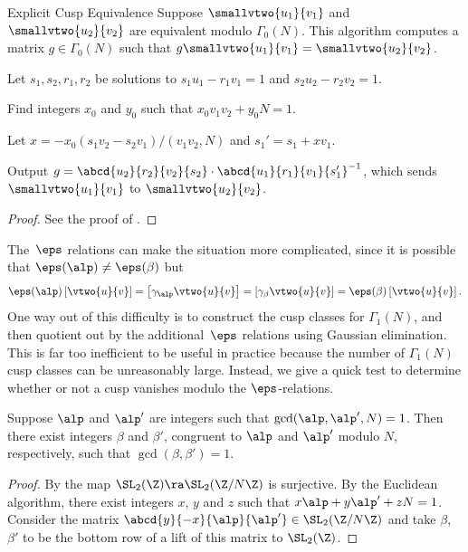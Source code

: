 \begin{algorithm}{Explicit Cusp Equivalence}\label{alg:cusp1}%
Suppose $\smallvtwo{u_1}{v_1}$ and 
$\smallvtwo{u_2}{v_2}$ 
are equivalent modulo $\Gamma_0(N)$. 
This algorithm computes a matrix $g\in\Gamma_0(N)$ such
that $g\smallvtwo{u_1}{v_1}=\smallvtwo{u_2}{v_2}$.
\begin{steps}
\item Let $s_1, s_2, r_1, r_2$ be solutions to
$s_1 u_1 -r_1 v_1 =1$ and
$s_2 u_2 -r_2 v_2 =1$.
\item Find integers $x_0$ and $y_0$ such
that $x_0v_1v_2+y_0N=1$.
\item Let $x=-x_0(s_1v_2-s_2v_1)/(v_1v_2,N)$
and $s_1' = s_1 + xv_1$.
\item Output $g=\abcd{u_2}{r_2}{v_2}{s_2}
       \cdot \abcd{u_1}{r_1}{v_1}{s_1'}^{-1}$,
which sends $\smallvtwo{u_1}{v_1}$ to $\smallvtwo{u_2}{v_2}$.
\end{steps}
\end{algorithm}
\begin{proof}
  See the proof of
 \cite[Prop.~\ref{prop:cusp1}]{cremona:algs}.
\end{proof}

The~$\eps$ relations can make the situation more
complicated, since it is possible that $\eps(\alp)\neq
\eps(\beta)$ but
$$\eps(\alp)\left[\vtwo{u}{v}\right] =\left[\gamma_\alp \vtwo{u}{v}\right]= 
  \left[\gamma_\beta \vtwo{u}{v}\right]=\eps(\beta)\left[\vtwo{u}{v}\right].$$
One way out of this difficulty  is to construct 
the cusp classes for $\Gamma_1(N)$, and then quotient
out by the additional~$\eps$ relations using
Gaussian elimination. This is far too
inefficient to be useful in practice because the number of
$\Gamma_1(N)$ cusp classes can be unreasonably large.  
Instead, we give a quick test to determine whether or not
a cusp vanishes modulo the $\eps$-relations.

\begin{lemma}\label{lem:canlift}
Suppose $\alp$ and $\alp'$ are integers
such that $\gcd(\alp,\alp',N)=1$.
Then there exist integers $\beta$ and $\beta'$,
congruent to $\alp$ and $\alp'$ modulo $N$, respectively,
 such that $\gcd(\beta,\beta')=1$.
\end{lemma}
\begin{proof}
By  the map
$\SL_2(\Z)\ra\SL_2(\Z/N\Z)$ is surjective.
By the Euclidean algorithm, there exist
integers $x$, $y$ and $z$ such that
$x\alp + y\alp' + zN = 1$.  
Consider the matrix
$\abcd{y}{-x}{\alp}{\hfill\alp'}\in \SL_2(\Z/N\Z)$
and take $\beta$, $\beta'$ to be the bottom
row of a lift of this matrix to $\SL_2(\Z)$.
\end{proof}

